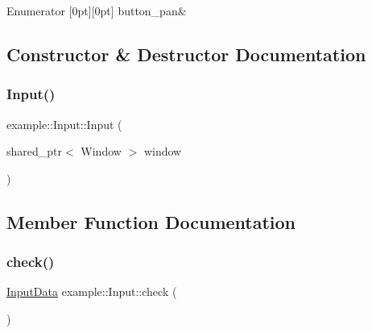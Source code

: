 \begin{DoxyEnumFields}{Enumerator}
[0pt][0pt]{}\mbox{\label{classexample_1_1_input_a315efe66cfd6b49cbe0f46ab46ece59fae744adfc1878946c23375555ec240cc3}} 
button\+\_\+pan&\\
\hline

\end{DoxyEnumFields}


\subsection{Constructor \& Destructor Documentation}
\mbox{\label{classexample_1_1_input_a7784c5ddeff5d467d26daef96cd4a303}} 
\subsubsection{\texorpdfstring{Input()}{Input()}}
{\footnotesize\ttfamily example\+::\+Input\+::\+Input (\begin{DoxyParamCaption}\item[{shared\+\_\+ptr$<$ Window $>$}]{window }\end{DoxyParamCaption})\hspace{0.3cm}{\ttfamily [inline]}}



\subsection{Member Function Documentation}
\mbox{\label{classexample_1_1_input_a0a4492b08db16e638a4cd7bcf56a70ed}} 
\subsubsection{\texorpdfstring{check()}{check()}}
{\footnotesize\ttfamily \mbox{\hyperlink{classexample_1_1_input_a574fd91f61d018474389e778c31e0da2}{Input\+Data}} example\+::\+Input\+::check (\begin{DoxyParamCaption}{ }\end{DoxyParamCaption})\hspace{0.3cm}{\ttfamily [inline]}}


